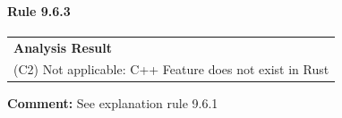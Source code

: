 \paragraph{Rule 9.6.3}
\begin{longtable}{p{13cm}}
\textbf{Analysis Result} \\
(C2) Not applicable: C++ Feature does not exist in Rust \\
\end{longtable}
\textbf{Comment:} See explanation rule 9.6.1 \\
